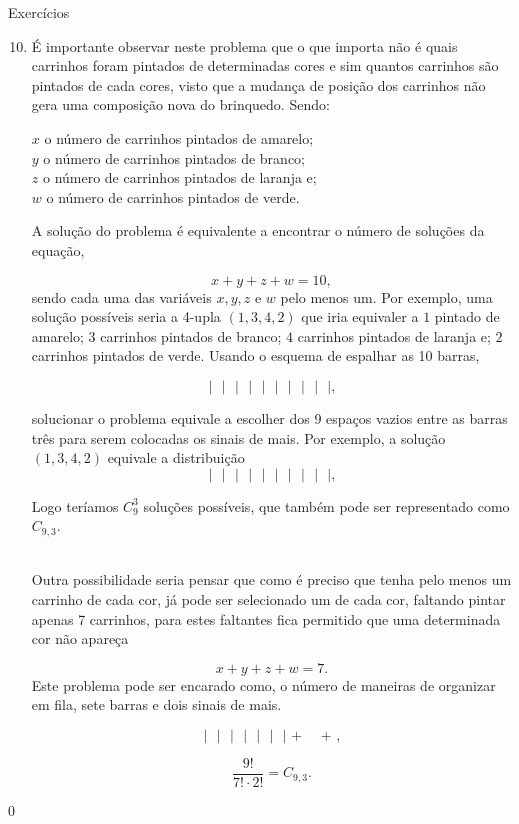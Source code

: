 \begin{answer}{Exercícios}
{\exerciselist
\begin{enumerate}\setcounter{enumi}{9}
\item 
É importante observar neste problema que o que importa não é quais carrinhos foram pintados de determinadas cores e sim quantos carrinhos são pintados de cada cores, visto que a mudança de posição dos carrinhos não gera uma composição nova do brinquedo. Sendo: 

$x$ o número de carrinhos pintados de amarelo; \\
$y$ o número de carrinhos pintados de branco;\\
$z$ o número de carrinhos pintados de laranja e;\\
$w$ o número de carrinhos pintados de verde. 

A solução do problema é equivalente a encontrar o número de soluções da equação, 

$$x+y+z+w =10,$$
sendo cada uma das variáveis $x,y,z$ e $w$ pelo menos um. Por exemplo, uma solução possíveis seria a 4-upla $(1,3,4,2)$ que iria equivaler a 
$1$  pintado de amarelo;
$3$ carrinhos pintados de branco;
$4$ carrinhos pintados de laranja e;
$2$ carrinhos pintados de verde. 
Usando o esquema de espalhar as 10 barras, 

$$\textbf{|~~|~~|~~|~~|~~|~~|~~|~~|~~|,}$$

solucionar o problema  equivale a escolher dos 9 espaços vazios entre as barras três para serem colocadas os sinais de mais.
Por exemplo, a solução $(1,3,4,2)$ equivale a distribuição
$$\textbf{|~~|~~|~~|~~|~~|~~|~~|~~|~~|,}$$

Logo teríamos $C_9^{3}$ soluções possíveis, que também pode ser representado como $C_{9,3}$.\\

~~

Outra possibilidade seria pensar que como é preciso que tenha pelo menos um carrinho de cada cor, já pode ser selecionado um de cada cor, faltando pintar apenas 7 carrinhos, para estes faltantes fica permitido que uma determinada cor não apareça

$$x+y+z+w =7.$$
Este problema pode ser encarado como, o número de maneiras de organizar em fila, sete barras e dois sinais de mais. 

$$\textbf{|~~|~~|~~|~~|~~|~~| + ~~ + ,}$$

$$\dfrac{9!}{7! \cdot 2!}=C_{9,3}. $$
\end{enumerate}
}{0}
\end{answer}

